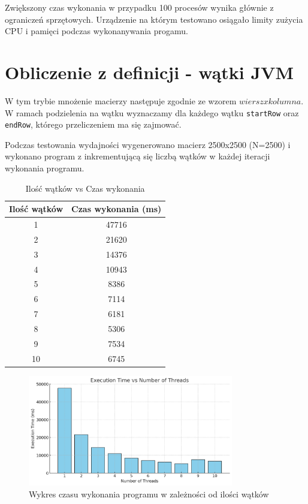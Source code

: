 \documentclass[11pt]{article}
\begin{document}
    Zwiększony czas wykonania w przypadku 100 procesów wynika głównie z ograniczeń sprzętowych. Urządzenie na którym testowano osiągało limity zużycia CPU i pamięci
    podczas wykonanywania progamu.

    \section{Obliczenie z definicji - wątki JVM}

    W tym trybie mnożenie macierzy następuje zgodnie ze wzorem $wiersz x kolumna$. W ramach podzielenia na wątku wyznaczamy
    dla każdego wątku \verb|startRow| oraz \verb|endRow|, którego przeliczeniem ma się zajmować.

    Podczas testowania wydajności wygenerowano macierz 2500x2500 (N=2500) i wykonano program z inkrementującą się liczbą
    wątków w każdej iteracji wykonania programu.

    \begin{table}[h]
        \centering
        \begin{tabular}{|c|c|}
            \hline
            \textbf{Ilość wątków} & \textbf{Czas wykonania (ms)} \\
            \hline
            1  & 47716 \\
            2  & 21620 \\
            3  & 14376 \\
            4  & 10943 \\
            5  & 8386  \\
            6  & 7114  \\
            7  & 6181  \\
            8  & 5306  \\
            9  & 7534  \\
            10 & 6745  \\
            \hline
        \end{tabular}
        \caption{Ilość wątków vs Czas wykonania}
    \end{table}

    \begin{figure}
        \centering
        \includegraphics[width=0.8\textwidth]{threads-plot.png}
        \caption{Wykres czasu wykonania programu w zależności od ilości wątków}
    \end{figure}
\end{document}
